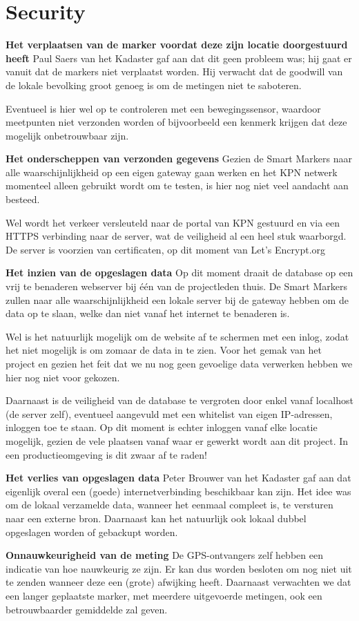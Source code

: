 \section{Security}
\textbf{Het verplaatsen van de marker voordat deze zijn locatie doorgestuurd
heeft} \newline
Paul Saers van het Kadaster gaf aan dat dit geen probleem was; hij gaat er
vanuit dat de markers niet verplaatst worden. Hij verwacht dat de goodwill van
de lokale bevolking groot genoeg is om de metingen niet te saboteren.

Eventueel is hier wel op te controleren met een bewegingssensor, waardoor
meetpunten niet verzonden worden of bijvoorbeeld een kenmerk krijgen dat deze
mogelijk onbetrouwbaar zijn.

\textbf{Het onderscheppen van verzonden gegevens} \newline
Gezien de Smart Markers naar alle waarschijnlijkheid op een eigen gateway gaan
werken en het KPN netwerk momenteel alleen gebruikt wordt om te testen, is hier
nog niet veel aandacht aan besteed.

Wel wordt het verkeer versleuteld naar de portal van KPN gestuurd en via een
HTTPS verbinding naar de server, wat de veiligheid al een heel stuk waarborgd.
De server is voorzien van certificaten, op dit moment van Let's Encrypt.org

\textbf{Het inzien van de opgeslagen data} \newline
Op dit moment draait de database op een vrij te benaderen webserver bij één van
de projectleden thuis. De Smart Markers zullen naar alle waarschijnlijkheid een
lokale server bij de gateway hebben om de data op te slaan, welke dan niet vanaf
het internet te benaderen is.

Wel is het natuurlijk mogelijk om de website af te schermen met een inlog, zodat
het niet mogelijk is om zomaar de data in te zien. Voor het gemak van het
project en gezien het feit dat we nu nog geen gevoelige data verwerken hebben we
hier nog niet voor gekozen.

Daarnaast is de veiligheid van de database te vergroten door enkel vanaf
localhost (de server zelf), eventueel aangevuld met een whitelist van eigen
IP-adressen, inloggen toe te staan. Op dit moment is echter inloggen vanaf elke
locatie mogelijk, gezien de vele plaatsen vanaf waar er gewerkt wordt aan dit
project. In een productieomgeving is dit zwaar af te raden!

\textbf{Het verlies van opgeslagen data} \newline
Peter Brouwer van het Kadaster gaf aan dat eigenlijk overal een (goede)
internetverbinding beschikbaar kan zijn. Het idee was om de lokaal verzamelde
data, wanneer het eenmaal compleet is, te versturen naar een externe bron.
Daarnaast kan het natuurlijk ook lokaal dubbel opgeslagen worden of gebackupt
worden.

\textbf{Onnauwkeurigheid van de meting} \newline
De GPS-ontvangers zelf hebben een indicatie van hoe nauwkeurig ze zijn. Er kan
dus worden besloten om nog niet uit te zenden wanneer deze een (grote) afwijking
heeft. Daarnaast verwachten we dat een langer geplaatste marker, met meerdere
uitgevoerde metingen, ook een betrouwbaarder gemiddelde zal geven.
